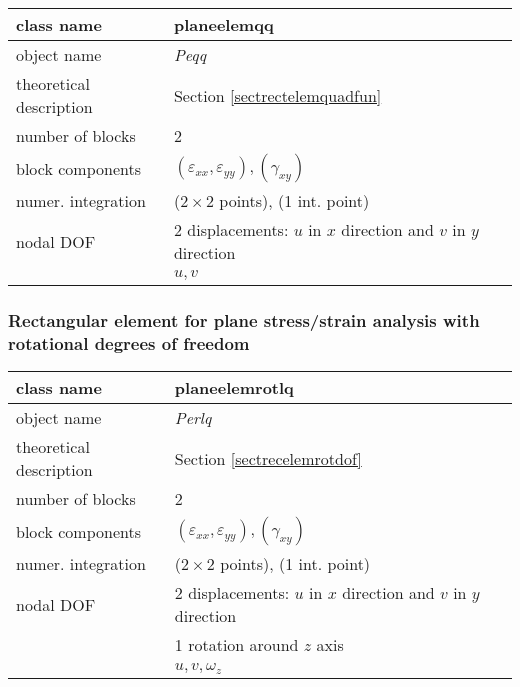 \begin{center}
\begin{tabular}{|l|l|}
\hline
class name & {\sf planeelemqq}\index{class!{\sf planeelemqq}}
\\ \hline
object name & {\it Peqq}\index{instance!{\it Peqq}}
\\ \hline
theoretical description & Section \ref{sectrectelemquadfun}
\\ \hline
number of blocks & 2
\\ \hline
block components & $(\varepsilon_{xx},\varepsilon_{yy}), (\gamma_{xy})$
\\ \hline
numer. integration & ($2 \times 2$ points), (1 int. point)
\\ \hline
nodal DOF & 2 displacements: $u$ in $x$ direction and $v$ in $y$ direction
\\ \cline{2-2}
 & $u,v$
\\ \hline
\end{tabular}
\end{center}

\subsubsection{Rectangular element for plane stress/strain ana\-lysis with rotational degrees of freedom}

\begin{center}
\begin{tabular}{|l|l|}
\hline
class name & {\sf planeelemrotlq}\index{class!{\sf planeelemrotlq}}
\\ \hline
object name & {\it Perlq}\index{instance!{\it Perlq}}
\\ \hline
theoretical description & Section \ref{sectrecelemrotdof}
\\ \hline
number of blocks & 2
\\ \hline
block components & $(\varepsilon_{xx},\varepsilon_{yy}), (\gamma_{xy})$
\\ \hline
numer. integration & ($2 \times 2$ points), (1 int. point)
\\ \hline
nodal DOF & 2 displacements: $u$ in $x$ direction and $v$ in $y$ direction
\\ \cline{2-2}
 & 1 rotation around $z$ axis
\\ \cline{2-2}
 & $u,v,\omega_z$
\\ \hline
\end{tabular}
\end{center}

